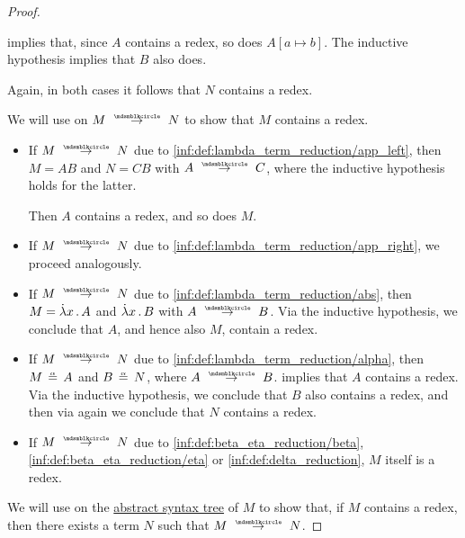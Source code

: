 \begin{proof}
\begin{itemize}
\begin{itemize}
       implies that, since \( A \) contains a redex, so does \( A[a \mapsto b] \). The inductive hypothesis implies that \( B \) also does.
    \end{itemize}

    Again, in both cases it follows that \( N \) contains a redex.
  \end{itemize}


  \SufficiencySubProof* We will use  on \( M \pred N \) to show that \( M \) contains a redex.

  \begin{itemize}
    \item If \( M \pred N \) due to \ref{inf:def:lambda_term_reduction/app_left}, then \( M = AB \) and \( N = CB \) with \( A \pred C \), where the inductive hypothesis holds for the latter.

    Then \( A \) contains a redex, and so does \( M \).

    \item If \( M \pred N \) due to \ref{inf:def:lambda_term_reduction/app_right}, we proceed analogously.

    \item If \( M \pred N \) due to \ref{inf:def:lambda_term_reduction/abs}, then \( M = \qabs x A \) and \( \qabs x B  \) with \( A \pred B \). Via the inductive hypothesis, we conclude that \( A \), and hence also \( M \), contain a redex.

    \item If \( M \pred N \) due to \ref{inf:def:lambda_term_reduction/alpha}, then \( M \aequiv A \) and \( B \aequiv N \), where \( A \pred B \).  implies that \( A \) contains a redex. Via the inductive hypothesis, we conclude that \( B \) also contains a redex, and then via  again we conclude that \( N \) contains a redex.

    \item If \( M \pred N \) due to \ref{inf:def:beta_eta_reduction/beta}, \ref{inf:def:beta_eta_reduction/eta} or \ref{inf:def:delta_reduction}, \( M \) itself is a redex.
  \end{itemize}

  \NecessitySubProof* We will use  on the \hyperref[def:lambda_term_ast]{abstract syntax tree} of \( M \) to show that, if \( M \) contains a redex, then there exists a term \( N \) such that \( M \pred N \).


\end{proof}
